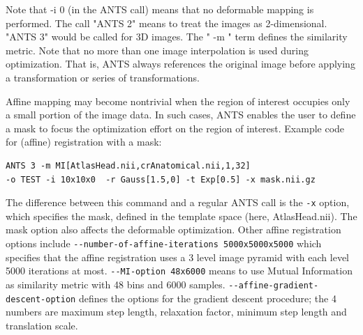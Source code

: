 \documentclass{InsightArticle}
\begin{document}
Note that -i 0 (in the ANTS call) means that no deformable mapping is performed. The call "ANTS 2" means to treat the images as 2-dimensional. "ANTS 3" would be called for 3D images. The " -m " term defines the similarity metric. 
Note that no more than one image interpolation is used during optimization.  
That is, ANTS always references the original image before applying a transformation or series of transformations. 

Affine mapping may become nontrivial when the region of interest 
occupies only a small portion of the image data.  In such cases, 
ANTS enables the user to define a mask to focus the optimization 
effort on the region of interest.  
Example code for (affine) registration with a mask: 
\begin{verbatim}
ANTS 3 -m MI[AtlasHead.nii,crAnatomical.nii,1,32] 
-o TEST -i 10x10x0  -r Gauss[1.5,0] -t Exp[0.5] -x mask.nii.gz
\end{verbatim}
The difference between this command 
and a regular ANTS call is the \verb"-x" option, which specifies the mask, defined in the 
template space (here, AtlasHead.nii).   The mask option also affects the deformable optimization. 
Other affine registration options include  \verb"--number-of-affine-iterations 5000x5000x5000" which specifies that the affine registration uses a 3 level image pyramid with each level 5000 iterations at most. \verb"--MI-option 48x6000" means to use Mutual Information as similarity metric with 48 bins and 6000 samples. \verb"--affine-gradient-descent-option" defines the options for the gradient descent procedure; the 4 numbers are maximum step length, relaxation factor, minimum step length and translation scale.  
\end{document}
